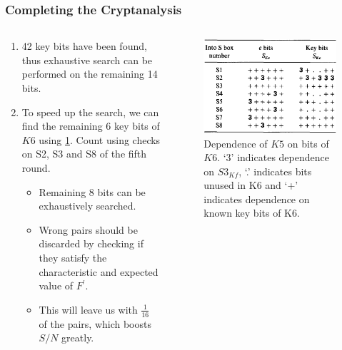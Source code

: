 \documentclass{beamer}
\begin{document}
	\begin{frame}
		\frametitle{Completing the Cryptanalysis}
		\begin{columns}
			\begin{column}{0.6\linewidth}
				\begin{enumerate}
					\item 42 key bits have been found, thus exhaustive search
					can be performed on the remaining 14 bits.
					\item To speed up the search, we can find the remaining 6
					key bits of \(K6\) using \cref{fig:des-k5}. Count using
					checks on S2, S3 and S8 of the fifth round. 
					\begin{itemize}
						\item Remaining 8 bits can be exhaustively searched. 
						\item Wrong pairs should be discarded by checking if
						they satisfy the characteristic and expected value of
						\(F^\prime\).
						\item This will leave us with \(\frac{1}{16}\) of the
						pairs, which boosts \(S/N\) greatly.
					\end{itemize}
				\end{enumerate}
			\end{column}
			\begin{column}{0.4\linewidth}
				\begin{figure}[!ht]
					\centering
					\includegraphics[width=\columnwidth]{images/des_k5.png}
					\caption{Dependence of \(K5\) on bits of \(K6\). `3'
					indicates dependence on \(S3_{Kf}\), `.' indicates bits
					unused in K6 and `+' indicates dependence on known key bits
					of K6.}
					\label{fig:des-k5}
				\end{figure}
			\end{column}
		\end{columns}
	\end{frame}
\end{document}
